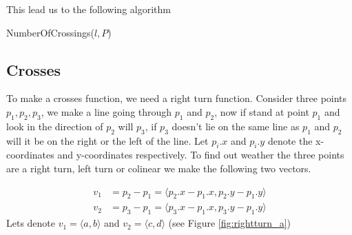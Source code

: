 This lead us to the following algorithm
\begin{algorithm} 
	\caption{NumberOfCrossings($l,P$)}
	\begin{algorithmic}[1] 
		\State {}
	\end{algorithmic}
\end{algorithm}

\subsection{Crosses}
To make a crosses function, we need a right turn function. Consider three
points $p_1,p_2,p_3$, we make a line going through $p_1$ and $p_2$, now if
stand at point $p_1$ and look in the direction of $p_2$ will $p_3$, if $p_3$
doesn't lie on the same line as $p_1$ and $p_2$ will it be on the
right or the left of the line. 
Let $p_i.x$ and $p_i.y$ denote the x-coordinates
and y-coordinates respectively.
To find out weather the three points are a right turn, left turn or colinear we
make the following two vectors.

\begin{align*}
	v_1 &=p_2-p_1 = \langle p_2.x-p_1.x,p_2.y-p_1.y\rangle\\
	v_2 &=p_3-p_1 = \langle p_3.x-p_1.x,p_3.y-p_1.y\rangle
\end{align*}
Lets denote $v_1 = \langle a,b\rangle$ and $v_2 = \langle c,d\rangle$
(see Figure \ref{fig:rightturn_a})
